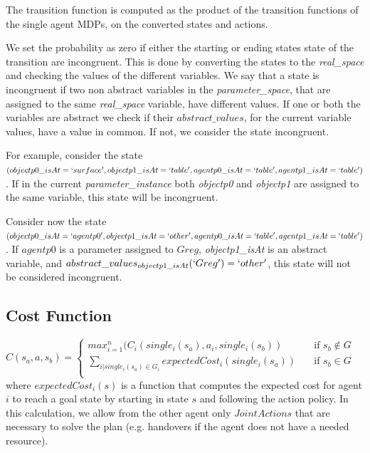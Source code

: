 The transition function is computed as the product of the transition functions of the single agent MDPs, on the converted states and actions.

We set the probability as zero if either the starting or ending states state of the transition are incongruent. This is done by converting the states to the \textit{real\_space} and checking the values of the different variables. We say that a state is incongruent if two non abstract variables in the \textit{parameter\_space}, that are assigned to the same \textit{real\_space} variable, have different values. If one or both the variables are abstract we check if their $abstract\_values$, for the current variable values, have a value in common. If not, we consider the state incongruent.

For example, consider the state $(objectp0\_isAt=`surface', objectp1\_isAt=`table', agentp0\_isAt=`table', agentp1\_isAt=`table')$. If in the current \textit{parameter\_instance} both \textit{objectp0} and \textit{objectp1} are assigned to the same variable, this state will be incongruent.

Consider now the state $(objectp0\_isAt=`agentp0', objectp1\_isAt=`other', agentp0\_isAt=`table', \\ agentp1\_isAt=`table')$. If $agentp0$ is a parameter assigned to $Greg$, \textit{objectp1\_isAt} is an abstract variable, and $abstract\_values_{objectp1\_isAt}(`Greg')=`other'$, this state will not be considered incongruent.  

\subsection{Cost Function}
$C(s_a,a,s_b)= 
	\begin{cases}
		max_{i=1}^{n}(C_i(single_i(s_a),a_i,single_i(s_b))  & \quad \text{if } s_b \not\in G \\
		\sum_{i | single_i(s_a) \in G_i} expectedCost_i(single_i(s_a))  & \quad \text{if } s_b \in  G
		\\
	\end{cases} $	\\

where $expectedCost_i(s)$ is a function that computes the expected cost for agent $i$ to reach a goal state by starting in state $s$ and following the action policy. In this calculation, we allow from the other agent only $JointActions$ that are necessary to solve the plan (e.g. handovers if the agent does not have a needed resource).

